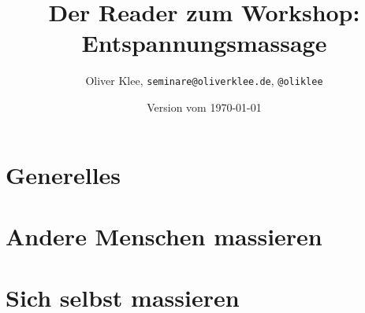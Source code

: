 \documentclass[a4paper,twoside,11pt,titlepage,openany]{scrbook}
\author{Oliver Klee, \texttt{seminare@oliverklee.de}, \texttt{@oliklee}}
\title{Der Reader zum Workshop: Entspannungsmassage}
\date{Version vom \today}
\begin{document}
\nocite*{}

\maketitle
\frontmatter



\tableofcontents

\mainmatter

\chapter{Generelles}


\chapter{Andere Menschen massieren}






\chapter{Sich selbst massieren}


\backmatter

\end{document}
